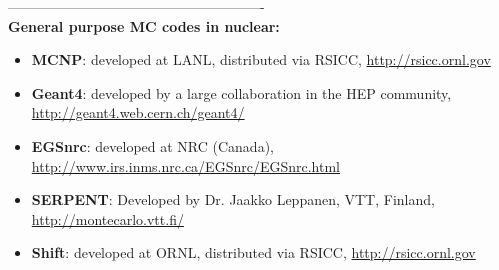 \documentclass[12pt]{article}
\begin{document}
-------------------------------------------------------\\
\textbf{General purpose MC codes in nuclear:}
\begin{itemize}
\item \textbf{MCNP}: developed at LANL, distributed via RSICC, \href{http://rsicc.ornl.gov}{http://rsicc.ornl.gov}
\item \textbf{Geant4}: developed by a large collaboration in the HEP community, \href{ http://geant4.web.cern.ch/geant4/}{http://geant4.web.cern.ch/geant4/}
\item \textbf{EGSnrc}: developed at NRC (Canada), \href{http://www.irs.inms.nrc.ca/EGSnrc/EGSnrc.html}{http://www.irs.inms.nrc.ca/EGSnrc/EGSnrc.html}
\item \textbf{SERPENT}: Developed by Dr. Jaakko Leppanen, VTT, Finland, \href{ http://montecarlo.vtt.fi/}{http://montecarlo.vtt.fi/}
\item \textbf{Shift}: developed at ORNL, distributed via RSICC, \href{http://rsicc.ornl.gov}{http://rsicc.ornl.gov}
\end{itemize}
\end{document}
